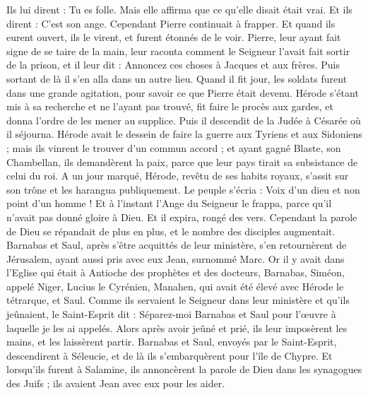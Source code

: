 \begin{multicols}{2}
Ils lui dirent : Tu es folle. Mais elle affirma que ce qu'elle disait était vrai.
Et ils dirent : C’est son ange. Cependant Pierre continuait à frapper. Et quand ils eurent ouvert, ils le virent, et furent étonnés de le voir.
Pierre, leur ayant fait signe de se taire de la main, leur raconta comment le Seigneur l'avait fait sortir de la prison, et il leur dit : Annoncez ces choses à Jacques et aux frères. Puis sortant de là il s'en alla dans un autre lieu.
Quand il fit jour, les soldats furent dans une grande agitation, pour savoir ce que Pierre était devenu.
Hérode s’étant mis à sa recherche et ne l’ayant pas trouvé, fit faire le procès aux gardes, et donna l’ordre de les mener au supplice. Puis il descendit de la Judée à Césarée où il séjourna.
Hérode avait le dessein de faire la guerre aux Tyriens et aux Sidoniens ; mais ils vinrent le trouver d'un commun accord ; et ayant gagné Blaste, son Chambellan, ils demandèrent la paix, parce que leur pays tirait sa subsistance de celui du roi.
A un jour marqué, Hérode, revêtu de ses habits royaux, s'assit sur son trône et les harangua publiquement.
Le peuple s'écria : Voix d'un dieu et non point d'un homme !
Et à l'instant l’Ange du Seigneur le frappa, parce qu'il n'avait pas donné gloire à Dieu. Et il expira, rongé des vers.
Cependant la parole de Dieu se répandait de plus en plus, et le nombre des disciples augmentait.
Barnabas et Saul, après s’être acquittés de leur ministère, s’en retournèrent de Jérusalem, ayant aussi pris avec eux Jean, surnommé Marc.
\VerseOne{}Or il y avait dans l'Eglise qui était à Antioche des prophètes et des docteurs, Barnabas, Siméon, appelé Niger, Lucius le Cyrénien, Manahen, qui avait été élevé avec Hérode le tétrarque, et Saul.
Comme ils servaient le Seigneur dans leur ministère et qu'ils jeûnaient, le Saint-Esprit dit : Séparez-moi Barnabas et Saul pour l’œuvre à laquelle je les ai appelés.
Alors après avoir jeûné et prié, ils leur imposèrent les mains, et les laissèrent partir.
Barnabas et Saul, envoyés par le Saint-Esprit, descendirent à Séleucie, et de là ils s’embarquèrent pour l’île de Chypre.
Et lorsqu’ils furent à Salamine, ils annoncèrent la parole de Dieu dans les synagogues des Juifs ; ils avaient Jean avec eux pour les aider.

\end{multicols}
